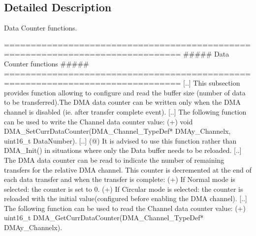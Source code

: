 \subsection{Detailed Description}
Data Counter functions. \begin{DoxyVerb} ===============================================================================
                      ##### Data Counter functions #####
 ===============================================================================
    [..] This subsection provides function allowing to configure and read the buffer 
         size (number of data to be transferred).The DMA data counter can be written 
         only when the DMA channel is disabled (ie. after transfer complete event).
    [..] The following function can be used to write the Channel data counter value:
         (+) void DMA_SetCurrDataCounter(DMA_Channel_TypeDef* DMAy_Channelx, uint16_t DataNumber).
    [..]
    (@) It is advised to use this function rather than DMA_Init() in situations 
        where only the Data buffer needs to be reloaded.
    [..] The DMA data counter can be read to indicate the number of remaining transfers 
         for the relative DMA channel. This counter is decremented at the end of each 
         data transfer and when the transfer is complete: 
         (+) If Normal mode is selected: the counter is set to 0.
         (+) If Circular mode is selected: the counter is reloaded with the initial 
         value(configured before enabling the DMA channel).
    [..] The following function can be used to read the Channel data counter value:
         (+) uint16_t DMA_GetCurrDataCounter(DMA_Channel_TypeDef* DMAy_Channelx).\end{DoxyVerb}


